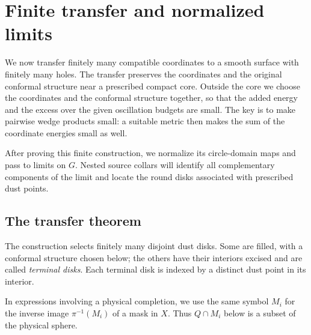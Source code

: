 \section{Finite transfer and normalized limits}\label{sec:transfer}

We now transfer finitely many compatible coordinates to a smooth surface
with finitely many holes.  The transfer preserves the coordinates and the
original conformal structure near a prescribed compact core.  Outside the
core we choose the coordinates and the conformal structure together, so
that the added energy and the excess over the given oscillation budgets
are small.  The key is to make pairwise wedge products small: a suitable
metric then makes the sum
of the coordinate energies small as well.

After proving this finite construction, we normalize its circle-domain
maps and pass to limits on $G$.  Nested source collars will identify all
complementary components of the limit and locate the round disks
associated with prescribed dust points.

\subsection{The transfer theorem}

The construction selects finitely many disjoint dust disks.  Some are
filled, with a conformal structure chosen below; the others have their
interiors excised and are called \emph{terminal disks}.  Each terminal
disk is indexed by a distinct dust point in its interior.

In expressions involving a physical completion, we use the same symbol
$M_i$ for the inverse image $\pi^{-1}(M_i)$ of a mask in $X$.
Thus $Q\cap M_i$ below is a subset of the physical sphere.


